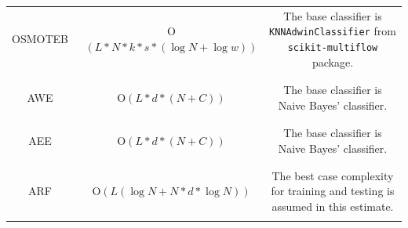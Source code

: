\documentclass[11pt]{article}
\begin{document}
\begin{table}[htbp]
{\begin{tabular}{| c | c | c |}
        OSMOTEB~  & O$(L * N * k * s * (\log N + \log w))$ & The base classifier is \texttt{KNNAdwinClassifier} from \texttt{scikit-multiflow} package. \\
        && \\
        \hline
        & & \\
        AWE~ & O$(L*d*(N+C))$ & The base classifier is Naive Bayes' classifier. \\
        & & \\
        \hline
        & & \\
        AEE~  & O$(L*d*(N+C))$ & The base classifier is Naive Bayes' classifier.\\
        & & \\
        \hline
        & & \\
        ARF~ & O$(L(\log N + N*d*\log N))$ & The best case complexity for training and testing is assumed in this estimate. \\
        & & \\
        \bottomrule
        \end{tabular}
}
\end{table}
\end{document}
